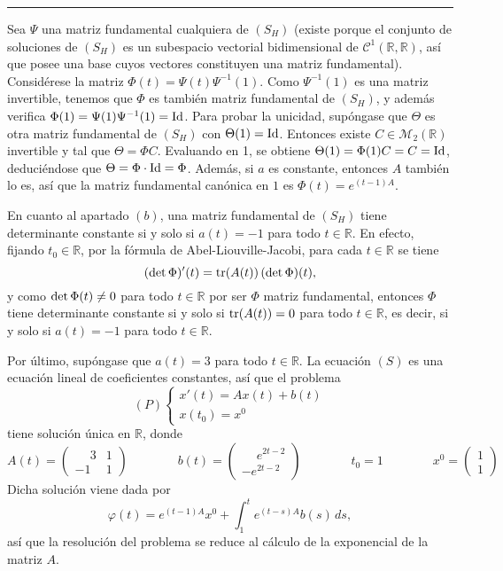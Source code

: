 \documentclass[11pt]{report}
\newcommand{\R}{\mathbb R}
\begin{document}
\vspace{2mm}

\hrule

\vspace{4mm}

Sea $\Psi$ una matriz fundamental cualquiera de $(S_H)$ (existe porque el conjunto de soluciones de $(S_H)$ es un subespacio vectorial bidimensional de $\mathcal{C}^1(\R,\R)$, así que posee una base cuyos vectores constituyen una matriz fundamental). Considérese la matriz $\Phi(t) =\Psi(t) \Psi^{-1}(1)$. Como $\Psi^{-1}(1)$ es una matriz invertible, tenemos que $\Phi$ es también matriz fundamental de $(S_H)$, y además verifica $\Phi(1)=\Psi(1)\Psi^{-1}(1)=\textup{Id}$. Para probar la unicidad, supóngase que $\Theta$ es otra matriz fundamental de $(S_H)$ con $\Theta(1)=\textup{Id}$. Entonces existe $C \in \mathcal{M}_2(\R)$ invertible y tal que $\Theta=\Phi C$. Evaluando en 1, se obtiene $\Theta(1)=\Phi(1)C=C=\textup{Id}$, deduciéndose que $\Theta=\Phi \cdot \textup{Id} = \Phi$. Además, si $a$ es constante, entonces $A$ también lo es, así que la matriz fundamental canónica en $1$ es $\Phi(t)=e^{(t-1)A}$.

\vspace{2mm}

En cuanto al apartado $(b)$, una matriz fundamental de $(S_H)$ tiene determinante constante si y solo si $a(t)=-1$ para todo $t \in \R$. En efecto, fijando $t_0 \in \R$, por la fórmula de Abel-Liouville-Jacobi, para cada $t \in \R$ se tiene
\[(\textup{det}\, \Phi)'(t)=\textup{tr}(A(t))\,(\textup{det} \, \Phi)(t),\]
y como $\textup{det} \, \Phi(t) \neq 0$ para todo $t \in \R$ por ser $\Phi$ matriz fundamental, entonces $\Phi$ tiene determinante constante si y solo si $\textup{tr}(A(t))=0$ para todo $t \in \R$, es decir, si y solo si $a(t)=-1$ para todo $t \in \R$.

\vspace{2mm}

Por último, supóngase que $a(t)=3$ para todo $t \in \R$. La ecuación $(S)$ es una ecuación lineal de coeficientes constantes, así que el problema
\[(P) \begin{cases}
 x'(t)=Ax(t)+b(t) \\
x(t_0)=x^0\end{cases}\]
tiene solución única en $\R$, donde
\[A(t)=\begin{pmatrix}
    \phantom{-}3 & 1 \\
    -1 & 1
\end{pmatrix} \qquad \qquad b(t)=\begin{pmatrix}
    \phantom{-}e^{2t-2} \\
    -e^{2t-2}
\end{pmatrix} \qquad \qquad t_0=1 \qquad \qquad x^0=\begin{pmatrix}
    1 \\
    1
\end{pmatrix}\]
Dicha solución viene dada por
\[\varphi(t)=e^{(t-1)A}x^0+\int_{1}^t e^{(t-s)A}b(s) \, ds,\]
así que la resolución del problema se reduce al cálculo de la exponencial de la matriz $A$.
\end{document}
